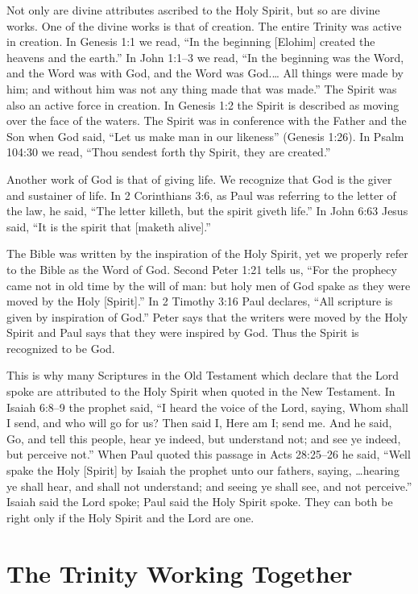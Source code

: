 Not only are divine attributes ascribed to the Holy Spirit,
but so are divine works. One of the divine works is that of
creation. The entire Trinity was active in creation. In Genesis
1:1 we read, “In the beginning [Elohim] created the heavens
and the earth.” In John 1:1–3 we read, “In the beginning was
the Word, and the Word was with God, and the Word was
God.… All things were made by him; and without him was
not any thing made that was made.” The Spirit was also an
active force in creation. In Genesis 1:2 the Spirit is described
as moving over the face of the waters. The Spirit was in conference
with the Father and the Son when God said, “Let us
make man in our likeness” (Genesis 1:26). In Psalm 104:30
we read, “Thou sendest forth thy Spirit, they are created.”

Another work of God is that of giving life. We recognize
that God is the giver and sustainer of life. In 2 Corinthians
3:6, as Paul was referring to the letter of the law, he said,
“The letter killeth, but the spirit giveth life.” In John 6:63
Jesus said, “It is the spirit that [maketh alive].”

The Bible was written by the inspiration of the Holy
Spirit, yet we properly refer to the Bible as the Word of God.
Second Peter 1:21 tells us, “For the prophecy came not in
old time by the will of man: but holy men of God spake as
they were moved by the Holy [Spirit].” In 2 Timothy 3:16
Paul declares, “All scripture is given by inspiration of God.”
Peter says that the writers were moved by the Holy Spirit
and Paul says that they were inspired by God. Thus the
Spirit is recognized to be God.

This is why many Scriptures in the Old Testament which
declare that the Lord spoke are attributed to the Holy Spirit
when quoted in the New Testament. In Isaiah 6:8–9 the
prophet said, “I heard the voice of the Lord, saying, Whom
shall I send, and who will go for us? Then said I, Here am
I; send me. And he said, Go, and tell this people, hear ye
indeed, but understand not; and see ye indeed, but perceive
not.” When Paul quoted this passage in Acts 28:25–26 he
said, “Well spake the Holy [Spirit] by Isaiah the prophet
unto our fathers, saying, …hearing ye shall hear, and shall
not understand; and seeing ye shall see, and not perceive.”
Isaiah said the Lord spoke; Paul said the Holy Spirit spoke.
They can both be right only if the Holy Spirit and the Lord
are one.


\section*{The Trinity Working Together}

